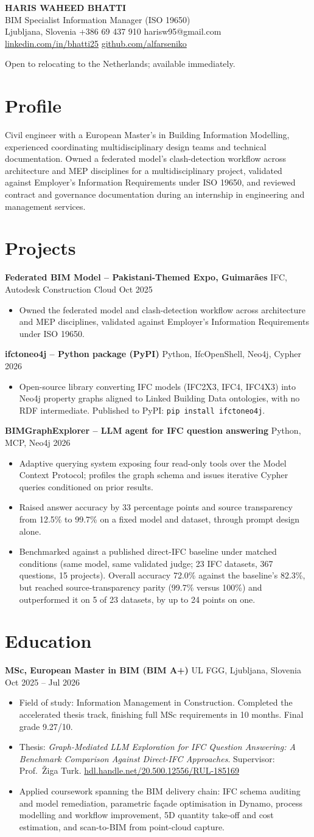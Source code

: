\documentclass[a4paper,10.5pt]{article}
\newcommand{\datefill}{\dotfill}
\newcommand{\entry}[3]{\vspace{2.5pt}\noindent\textbf{#1} \textbar{} #2 \datefill{} #3\par\vspace{0.5pt}}
\newcommand{\ROLELINE}{BIM Specialist \textbar{} Information Manager (ISO 19650)}
\newcommand{\projIfcToNeo}{%
\entry{ifctoneo4j -- Python package (PyPI)}{Python, IfcOpenShell, Neo4j, Cypher}{2026}
\begin{itemize}
  \item Open-source library converting IFC models (IFC2X3, IFC4, IFC4X3) into Neo4j
        property graphs aligned to Linked Building Data ontologies, with no RDF
        intermediate. Published to PyPI: \texttt{pip install ifctoneo4j}.
\end{itemize}}
\newcommand{\projBIMGraph}{%
\entry{BIMGraphExplorer -- LLM agent for IFC question answering}{Python, MCP, Neo4j}{2026}
\begin{itemize}
  \item Adaptive querying system exposing four read-only tools over the Model
        Context Protocol; profiles the graph schema and issues iterative Cypher
        queries conditioned on prior results.
  \item Raised answer accuracy by 33 percentage points and source transparency from
        12.5\% to 99.7\% on a fixed model and dataset, through prompt design alone.
  \item Benchmarked against a published direct-IFC baseline under matched
        conditions (same model, same validated judge; 23 IFC datasets, 367
        questions, 15 projects). Overall accuracy 72.0\% against the baseline's
        82.3\%, but reached source-transparency parity (99.7\% versus 100\%) and
        outperformed it on 5 of 23 datasets, by up to 24 points on one.
\end{itemize}}
\newcommand{\projGuimaraes}{%
\entry{Federated BIM Model -- Pakistani-Themed Expo, Guimar\~aes}{IFC, Autodesk Construction Cloud}{Oct 2025}
\begin{itemize}
  \item Owned the federated model and clash-detection workflow across architecture
        and MEP disciplines, validated against Employer's Information Requirements
        under ISO 19650.
\end{itemize}}
\begin{document}
\begin{center}
  {\LARGE\bfseries HARIS WAHEED BHATTI}\\[2pt]
  {\large \ROLELINE}\\[3pt]
  Ljubljana, Slovenia \textbar{} +386 69 437 910 \textbar{} harisw95@gmail.com\\
  \href{https://linkedin.com/in/bhatti25}{linkedin.com/in/bhatti25} \textbar{}
  \href{https://github.com/alfarseniko}{github.com/alfarseniko}
\end{center}
\vspace{-4pt}
\noindent\small Open to relocating to the Netherlands; available immediately.\normalsize

\section{Profile}

\noindent Civil engineer with a European Master's in Building Information Modelling,
experienced coordinating multidisciplinary design teams and technical documentation.
Owned a federated model's clash-detection workflow across architecture and MEP
disciplines for a multidisciplinary project, validated against Employer's
Information Requirements under ISO 19650, and reviewed contract and governance
documentation during an internship in engineering and management services.

\section{Projects}

 \projGuimaraes \projIfcToNeo \projBIMGraph

\section{Education}
\entry{MSc, European Master in BIM (BIM A+)}{UL FGG, Ljubljana, Slovenia}{Oct 2025 -- Jul 2026}
\begin{itemize}
  \item Field of study: Information Management in Construction. Completed the
        accelerated thesis track, finishing full MSc requirements in 10 months.
        Final grade 9.27/10.
  \item Thesis: \textit{Graph-Mediated LLM Exploration for IFC Question Answering:
        A Benchmark Comparison Against Direct-IFC Approaches}. Supervisor:
        Prof.~\v{Z}iga Turk. \href{http://hdl.handle.net/20.500.12556/RUL-185169}{hdl.handle.net/20.500.12556/RUL-185169}
  \item Applied coursework spanning the BIM delivery chain: IFC schema auditing and model remediation, parametric façade optimisation in Dynamo, process modelling and workflow improvement, 5D quantity take-off and cost estimation, and scan-to-BIM from point-cloud capture.
\end{itemize}
\end{document}
